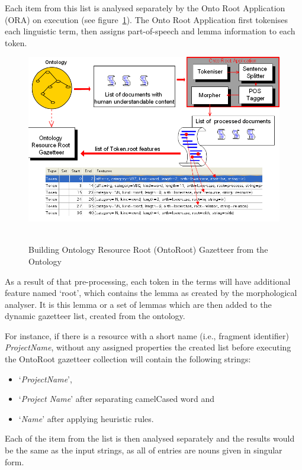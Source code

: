 Each item from this list is analysed separately by the Onto Root Application
(ORA) on execution (see figure~\ref{fig:ontoRootGaz}). The Onto Root Application
first tokenises each linguistic term, then assigns part-of-speech and lemma
information to each token.

\begin{figure}
\begin{center}
\includegraphics[width=12cm]{ontoRootGaz.png} \ \
\caption{Building Ontology Resource Root (OntoRoot) Gazetteer from the Ontology}
\label{fig:ontoRootGaz}
\end{center}
\end{figure}
As a result of that pre-processing, each token in the terms will have additional
feature named `root', which contains the lemma as created by the morphological
analyser. It is this lemma or a set of lemmas which are then added to the
dynamic gazetteer list, created from the ontology.

For instance, if there is a resource with a short name (i.e., fragment
identifier) \emph{ProjectName}, without any assigned properties the created list
before executing the OntoRoot gazetteer collection  will contain the following
strings:
\begin{itemize}
\item `\emph{ProjectName}',
\item `\emph{Project Name}' after separating camelCased word and
\item `\emph{Name}' after applying heuristic rules.
\end{itemize}

Each of the item from the list is then analysed separately and the results
would be the same as the input strings, as all of entries are nouns given in
singular form.

